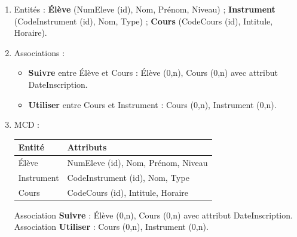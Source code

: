 \begin{enumerate}
    \item Entités : \textbf{Élève} (NumEleve (id), Nom, Prénom, Niveau) ; \textbf{Instrument} (CodeInstrument (id), Nom, Type) ; \textbf{Cours} (CodeCours (id), Intitule, Horaire).
    \item Associations :
    \begin{itemize}
        \item \textbf{Suivre} entre Élève et Cours : Élève (0,n), Cours (0,n) avec attribut DateInscription.
        \item \textbf{Utiliser} entre Cours et Instrument : Cours (0,n), Instrument (0,n).
    \end{itemize}
    \item MCD :
    \begin{center}
    \begin{tabular}{|l|l|}
    \hline
    \textbf{Entité} & \textbf{Attributs} \\
    \hline
    Élève & NumEleve (id), Nom, Prénom, Niveau \\
    \hline
    Instrument & CodeInstrument (id), Nom, Type \\
    \hline
    Cours & CodeCours (id), Intitule, Horaire \\
    \hline
    \end{tabular}
    \end{center}
    Association \textbf{Suivre} : Élève (0,n), Cours (0,n) avec attribut DateInscription.
    Association \textbf{Utiliser} : Cours (0,n), Instrument (0,n).
\end{enumerate}

